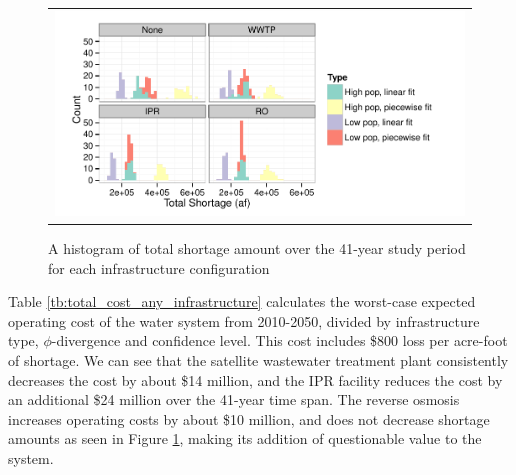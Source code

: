 \documentclass[opre,nonblindrev]{informs3} %
\begin{document}
\begin{figure}
	\FIGURE
	{%
		\begin{tabular}{c}
			\includegraphics*[width=.9\textwidth]{images/combined_shortage_frequency}%
		\end{tabular}
	}
	{
		A histogram of total shortage amount over the 41-year study period for each infrastructure configuration
		\label{fig:shortage_frequency_combined}
	}
	{}
\end{figure}

Table \ref{tb:total_cost_any_infrastructure} calculates the worst-case expected operating cost of the water system from 2010-2050, divided by infrastructure type, $\phi$-divergence and confidence level.
This cost includes \$800 loss per acre-foot of shortage.
We can see that the satellite wastewater treatment plant consistently decreases the cost by about \$14 million, and the IPR facility reduces the cost by an additional \$24 million over the 41-year time span.
The reverse osmosis increases operating costs by about \$10 million, and does not decrease shortage amounts as seen in Figure \ref{fig:shortage_frequency_combined}, making its addition of questionable value to the system.
\end{document}
